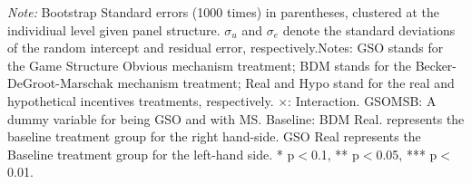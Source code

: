 \documentclass[12pt]{article}
\begin{document}
\begin{table}[H]
{\begin{tabular}{l*{1}{cc}}
    \end{tabular}
    }



\begin{tablenotes}
            \footnotesize
            \item \textit{Note:} Bootstrap Standard errors (1000 times) in parentheses, clustered at the individiual level given panel structure. $\sigma_u$ and $\sigma_e$ denote the standard deviations of the random intercept and residual error, respectively.Notes: GSO stands for the Game Structure Obvious mechanism treatment; BDM stands for the Becker-DeGroot-Marschak mechanism treatment; Real and Hypo stand for the real and hypothetical incentives treatments, respectively. $\times$: Interaction. GSOMSB: A dummy variable for being GSO and with MS. Baseline: BDM Real. represents the baseline treatment group for the right hand-side. GSO Real represents the Baseline treatment group for the left-hand side. * p$<$0.1, ** p$<$0.05, *** p$<$0.01.
        \end{tablenotes}
\end{table}











\clearpage
\end{document}
